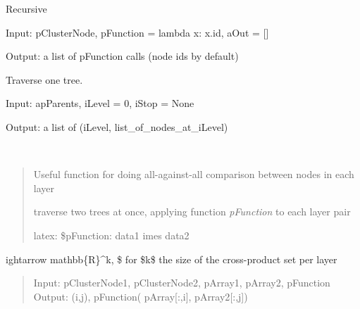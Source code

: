 \documentclass[letterpaper,10pt,english]{sphinxmanual}
\begin{document}

\begin{fulllineitems}
\label{index:halla.hierarchy.reduce_tree}
Recursive

Input: pClusterNode, pFunction = lambda x: x.id, aOut = {[}{]}

Output: a list of pFunction calls (node ids by default)

\end{fulllineitems}


\begin{fulllineitems}
\label{index:halla.hierarchy.reduce_tree_by_layer}
Traverse one tree.

Input: apParents, iLevel = 0, iStop = None

Output: a list of (iLevel, list\_of\_nodes\_at\_iLevel)

\end{fulllineitems}


\begin{fulllineitems}
\label{index:halla.hierarchy.traverse_by_layer}~\begin{quote}

Useful function for doing all-against-all comparison between nodes in each layer

traverse two trees at once, applying function \emph{pFunction} to each layer pair

latex: \$pFunction: data1        imes data2
\end{quote}

ightarrow mathbb\{R\}\textasciicircum{}k, \$ for \$k\$ the size of the cross-product set per layer
\begin{quote}

Input: pClusterNode1, pClusterNode2, pArray1, pArray2, pFunction
Output: (i,j), pFunction( pArray{[}:,i{]}, pArray2{[}:,j{]})
\end{quote}

\end{fulllineitems}
\end{document}
